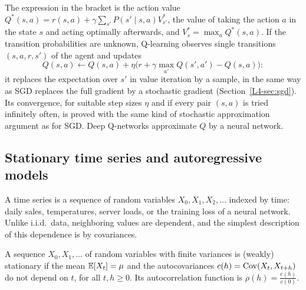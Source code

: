The expression in the bracket is the action value $Q^*(s, a) = r(s, a) + \gamma\sum_{s'}P(s' \mid s, a)V^*_{s'}$, the value of taking the action $a$ in the state $s$ and acting optimally afterwards, and $V^*_s = \max_a Q^*(s, a)$. If the transition probabilities are unknown, Q-learning observes single transitions $(s, a, r, s')$ of the agent and updates
\[Q(s, a) \leftarrow Q(s, a) + \eta\big(r + \gamma\max_{a'}Q(s', a') - Q(s, a)\big):\]
it replaces the expectation over $s'$ in value iteration by a sample, in the same way as SGD replaces the full gradient by a stochastic gradient (Section~\ref{L4-sec:sgd}). Its convergence, for suitable step sizes $\eta$ and if every pair $(s, a)$ is tried infinitely often, is proved with the same kind of stochastic approximation argument as for SGD. Deep Q-networks approximate $Q$ by a neural network.

\subsection{Stationary time series and autoregressive models}\label{L4-sec:time-series}

A time series is a sequence of random variables $X_0, X_1, X_2, \ldots$ indexed by time: daily sales, temperatures, server loads, or the training loss of a neural network. Unlike i.i.d.\ data, neighboring values are dependent, and the simplest description of this dependence is by covariances.

\begin{definition}\label{L4-def:stationary-series}
    A sequence $X_0, X_1, \ldots$ of random variables with finite variances is (weakly) stationary if the mean $\mathbb{E}[X_t] = \mu$ and the autocovariances $c(h) = \operatorname{Cov}(X_t, X_{t+h})$ do not depend on $t$, for all $t, h \geq 0$. Its autocorrelation function is $\rho(h) = \frac{c(h)}{c(0)}$.
\end{definition}

